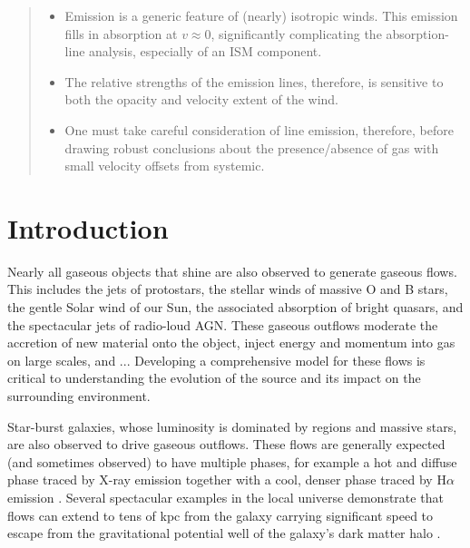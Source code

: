 \documentclass[12pt,preprint]{aastex}
\begin{document}
\begin{abstract}
\begin{itemize}
\item Emission is a generic feature of (nearly) isotropic winds.  This
  emission fills in absorption at $v \approx 0$, significantly
  complicating the absorption-line analysis, especially of an ISM
  component. 
\item The relative strengths of the emission
lines, therefore, is sensitive to both the opacity and velocity
extent of the wind.
\item  One must take careful
consideration of line emission, therefore,  before drawing robust
conclusions about the presence/absence of gas with small velocity
offsets from systemic. 
\end{itemize}
\end{abstract}


\section{Introduction}

Nearly all gaseous objects that shine are also
observed to generate gaseous flows.  This includes the jets of protostars, the
stellar winds of massive O and B stars, the gentle Solar wind
of our Sun, the associated absorption of bright quasars, and the
spectacular jets of radio-loud AGN.   These gaseous outflows moderate
the accretion of new material onto the object, inject energy and
momentum into gas on large scales, and ...
Developing a comprehensive model for these flows is critical to
understanding the evolution of the source and its impact on the
surrounding environment.

Star-burst galaxies, whose luminosity is dominated by  regions
and massive stars, are also observed to drive gaseous outflows.  These
flows are generally expected (and sometimes observed) to have multiple
phases, for example a hot and diffuse phase traced by X-ray emission
together with a cool, denser phase traced by H$\alpha$ emission 
\citep[e.g.][]{shc+04,km10}. 
Several spectacular
examples in the local universe demonstrate that flows can extend to
tens of kpc from the galaxy \citep{M87} carrying significant speed
to escape from the gravitational potential well of the galaxy's dark
matter halo \citep{wind_escape}.
\end{document}
